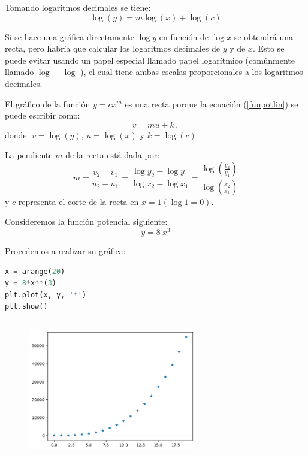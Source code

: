 Tomando logaritmos decimales  se tiene:
\begin{equation}
\log (y)=m \log (x)+\log (c)
\label{funpotlin}
\end{equation}

Si se hace una gr\'afica directamente $\log y$ en funci\'on de $\log x$ se obtendr\'a una recta, pero habr\'ia que calcular los logaritmos decimales de $y$ y de $x$. Esto se puede  evitar  usando un papel especial llamado papel logar\'itmico (com\'unmente llamado $\log-\log$ ), el cual tiene ambas escalas proporcionales a los logaritmos decimales.

El gr\'afico de la funci\'on $y=c x^m$ es una recta porque la ecuaci\'on (\ref{funpotlin}) se puede escribir como:
$$
v=m u+k \,,
$$
donde: $v =\log(y) $, $u=\log(x) $ y $k=\log(c)$

La pendiente $m$ de la recta est\'a dada por:
$$
m =\frac{v_2-v_1}{u_2-u_1}  =\frac{\log y_2-\log y_1}{\log x_2-\log x_1}=\frac{\log \left(\frac{y_2}{y_1}\right)}{\log \left(\frac{x_2}{x_1}\right)}
$$
y $c$ representa el corte de la recta en $x=1(\log 1=0)$.

Consideremos la  funci\'on potencial siguiente:
$$
y = 8\ x^{3}
$$

Procedemos a realizar su gr\'afica:
\begin{lstlisting}[language=Python] 
x = arange(20)
y = 8*x**(3)
plt.plot(x, y, '*')
plt.show()
\end{lstlisting}
\begin{figure}[h]
\begin{center}
\includegraphics[height=2.4in,width=2.9in]{figuras/fig16}  
\label{figexp1}
\end{center}
\end{figure}
\newpage


